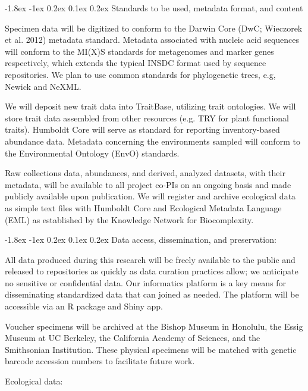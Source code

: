 \documentclass[11pt]{article}
\makeatletter
\renewcommand\section{\@startsection{section}{1}{\z@}%
                                  {-1.8ex \@plus -1ex \@minus 0.2ex}%
                                  {0.1ex \@plus 0.2ex}%
                                  {\normalfont\Large\bfseries}}
\renewcommand{\paragraph}{\@startsection{paragraph}{4}{\z@}
  {1ex \@plus 1ex \@minus .2ex}{-1em}
  {\normalfont\normalsize\bf}
}
\makeatother
\begin{document}
\section{Standards to be used, metadata format, and content}

Specimen data will be digitized to conform to the Darwin Core (DwC; Wieczorek et al. 2012) metadata standard.  Metadata associated with nucleic acid sequences will conform to the MI(X)S standards for metagenomes and marker genes respectively, which extends the typical INSDC format used by sequence repositories.   We plan to use common standards for phylogenetic trees, e.g, Newick and NeXML.  

We will deposit new trait data into TraitBase, utilizing trait ontologies.  We will store trait data assembled from other resources (e.g. TRY for plant functional traits). Humboldt Core will serve as standard for reporting inventory-based abundance data.   Metadata concerning the environments sampled will conform to the Environmental Ontology (EnvO) standards.  

Raw collections data, abundances, and derived, analyzed datasets, with their metadata, will be available to all project co-PIs on an ongoing basis and made publicly available upon publication. We will register and archive ecological data as simple text files with Humboldt Core and Ecological Metadata Language (EML) as established by the Knowledge Network for Biocomplexity.

\section{Data access, dissemination, and preservation:} 

All data produced during this research will be freely available to the public and released to repositories as quickly as data curation practices allow; we anticipate no sensitive or confidential data.   Our informatics platform is a key means for disseminating standardized data that can joined as needed.  The platform will be accessible via an R package and Shiny app.

Voucher specimens will be archived at the Bishop Museum in Honolulu, the Essig Museum at UC Berkeley, the California Academy of Sciences, and the Smithsonian Institution. These physical specimens will be matched with genetic barcode accession numbers to facilitate future work.

\paragraph{Ecological data:} 
\end{document}
